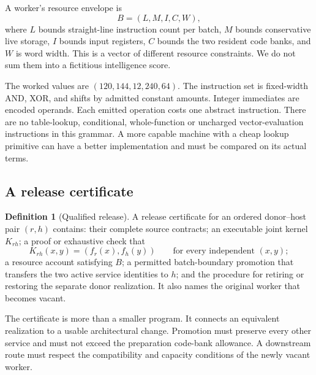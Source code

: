 \documentclass[11pt,letterpaper]{article}
\theoremstyle{definition}\newtheorem{definition}[theorem]{Definition}
\theoremstyle{remark}\newtheorem{remark}[theorem]{Remark}
\begin{document}
A worker's resource envelope is
\begin{equation}
 B=(L,M,I,C,W),
 \label{eq:budget}
\end{equation}
where $L$ bounds straight-line instruction count per batch, $M$ bounds conservative live storage, $I$ bounds input registers, $C$ bounds the two resident code banks, and $W$ is word width. This is a vector of different resource constraints. We do not sum them into a fictitious intelligence score.

The worked values are $(120,144,12,240,64)$. The instruction set is fixed-width AND, XOR, and shifts by admitted constant amounts. Integer immediates are encoded operands. Each emitted operation costs one abstract instruction. There are no table-lookup, conditional, whole-function or uncharged vector-evaluation instructions in this grammar. A more capable machine with a cheap lookup primitive can have a better implementation and must be compared on its actual terms.

\subsection{A release certificate}
\begin{definition}[Qualified release]
A release certificate for an ordered donor--host pair $(r,h)$ contains: their complete source contracts; an executable joint kernel $K_{rh}$; a proof or exhaustive check that
\begin{equation}
 K_{rh}(x,y)=(f_r(x),f_h(y))\qquad\text{for every independent }(x,y);
 \label{eq:fusion}
\end{equation}
a resource account satisfying $B$; a permitted batch-boundary promotion that transfers the two active service identities to $h$; and the procedure for retiring or restoring the separate donor realization. It also names the original worker that becomes vacant.
\end{definition}

The certificate is more than a smaller program. It connects an equivalent realization to a usable architectural change. Promotion must preserve every other service and must not exceed the preparation code-bank allowance. A downstream route must respect the compatibility and capacity conditions of the newly vacant worker.
\end{document}
